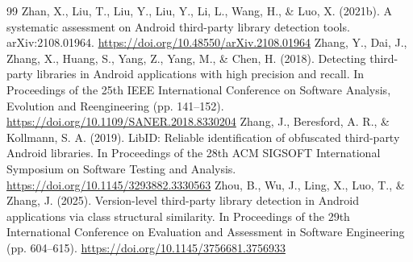\documentclass[10pt,twocolumn]{article}
\begin{document}
\begin{thebibliography}{99}
 Zhan, X., Liu, T., Liu, Y., Liu, Y., Li, L., Wang, H., \& Luo, X. (2021b). A systematic assessment on Android third-party library detection tools. arXiv:2108.01964. \url{https://doi.org/10.48550/arXiv.2108.01964}
 Zhang, Y., Dai, J., Zhang, X., Huang, S., Yang, Z., Yang, M., \& Chen, H. (2018). Detecting third-party libraries in Android applications with high precision and recall. In Proceedings of the 25th IEEE International Conference on Software Analysis, Evolution and Reengineering (pp. 141–152). \url{https://doi.org/10.1109/SANER.2018.8330204}
 Zhang, J., Beresford, A. R., \& Kollmann, S. A. (2019). LibID: Reliable identification of obfuscated third-party Android libraries. In Proceedings of the 28th ACM SIGSOFT International Symposium on Software Testing and Analysis. \url{https://doi.org/10.1145/3293882.3330563}
 Zhou, B., Wu, J., Ling, X., Luo, T., \& Zhang, J. (2025). Version-level third-party library detection in Android applications via class structural similarity. In Proceedings of the 29th International Conference on Evaluation and Assessment in Software Engineering (pp. 604–615). \url{https://doi.org/10.1145/3756681.3756933}
\end{thebibliography}
\end{document}
